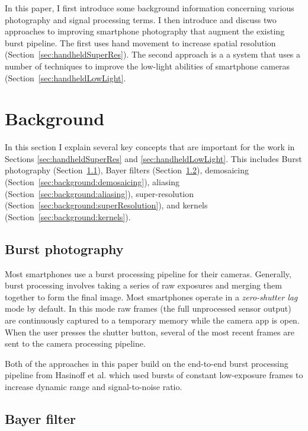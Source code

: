 \documentclass{sig-alternate}
\begin{document}
In this paper, I first introduce some background information concerning various photography and signal processing terms. I then introduce and discuss two approaches to improving smartphone photography that augment the existing burst pipeline. The first uses hand movement to increase spatial resolution (Section~\ref{sec:handheldSuperRes}). The second approach is a a system that uses a number of techniques to improve the low-light abilities of smartphone cameras (Section~\ref{sec:handheldLowLight}.

\section{Background}
\label{sec:background}

In this section I explain several key concepts that are important for the work in Sections \ref{sec:handheldSuperRes} and \ref{sec:handheldLowLight}. This includes Burst photography (Section~\ref{sec:background:burstPhotography}), Bayer filters (Section~\ref{sec:background:bayerFilter}), demosaicing (Section~\ref{sec:background:demosaicing}), aliasing (Section~\ref{sec:background:aliasing}), super-resolution (Section~\ref{sec:background:superResolution}), and kernels (Section~\ref{sec:background:kernels}).

\subsection{Burst photography}
\label{sec:background:burstPhotography}

Most smartphones use a burst processing pipeline for their cameras. Generally, burst processing involves taking a series of raw exposures and merging them together to form the final image. Most smartphones operate in a \emph{zero-shutter lag} mode by default. In this mode raw frames (the full unprocessed sensor output) are continuously captured to a temporary memory while the camera app is open. When the user presses the shutter button, several of the most recent frames are sent to the camera processing pipeline.

Both of the approaches in this paper build on the end-to-end burst processing pipeline from Hasinoff et al. \cite{Hasinoff2016} which used bursts of constant low-exposure frames to increase dynamic range and signal-to-noise ratio.

\subsection{Bayer filter}
\label{sec:background:bayerFilter}
\end{document}
